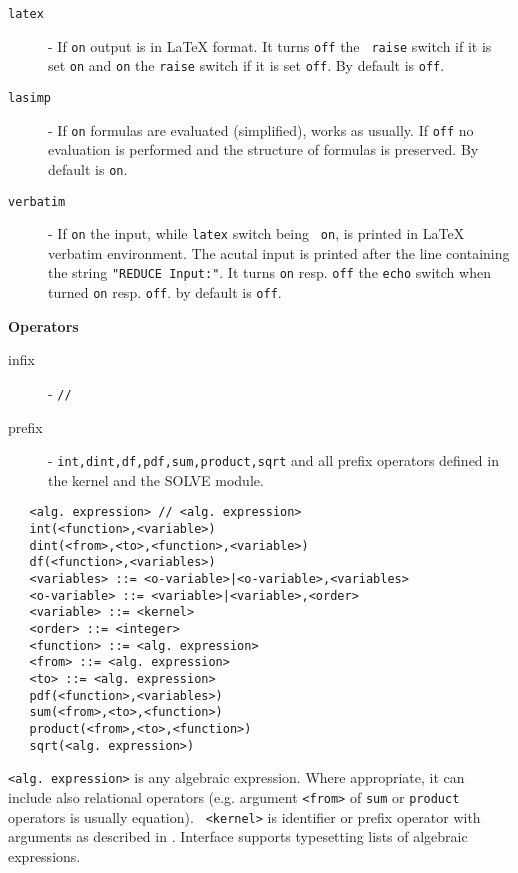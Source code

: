 \begin{description}
\item[{\tt latex}]
- If {\tt on} output is in \LaTeX{} format. It turns {\tt off} the {\tt
raise} switch if it is set {\tt on} and {\tt on} the {\tt raise} switch
if it is set {\tt off}. By default is {\tt off}.
\item[{\tt lasimp}]
- If {\tt on} formulas are evaluated (simplified), \REDUCE{} works
as usually. If {\tt off} no evaluation is performed and the structure
of formulas is preserved. By default is {\tt on}.
\item[{\tt verbatim}]
- If {\tt on} the \REDUCE{} input, while {\tt latex} switch being {\tt
on}, is printed in \LaTeX{} verbatim environment. The acutal \REDUCE{}
input is printed after the line containing the string {\tt "REDUCE
Input:"}.  It turns {\tt on} resp. {\tt off} the {\tt echo} switch when
turned {\tt on} resp. {\tt off}. by default is {\tt off}.
\end{description}

\textbf{Operators}

\begin{description}
\item[infix] - \verb+//+
\item[prefix] - {\tt int,dint,df,pdf,sum,product,sqrt} and all \REDUCE{}
prefix operators defined in the \REDUCE{} kernel and the SOLVE module.
\end{description}

\begin{verbatim}
   <alg. expression> // <alg. expression>
   int(<function>,<variable>)
   dint(<from>,<to>,<function>,<variable>)
   df(<function>,<variables>)
   <variables> ::= <o-variable>|<o-variable>,<variables>
   <o-variable> ::= <variable>|<variable>,<order>
   <variable> ::= <kernel>
   <order> ::= <integer>
   <function> ::= <alg. expression>
   <from> ::= <alg. expression>
   <to> ::= <alg. expression>
   pdf(<function>,<variables>)
   sum(<from>,<to>,<function>)
   product(<from>,<to>,<function>)
   sqrt(<alg. expression>)
\end{verbatim}

{\tt <alg. expression>} is any algebraic expression. Where appropriate,
it can include also relational operators (e.g. argument {\tt <from>} of
{\tt sum} or {\tt product} operators is usually equation). {\tt
<kernel>} is identifier or prefix operator with arguments as described
in \cite{Hearn:91}. Interface supports typesetting lists of algebraic
expressions.


